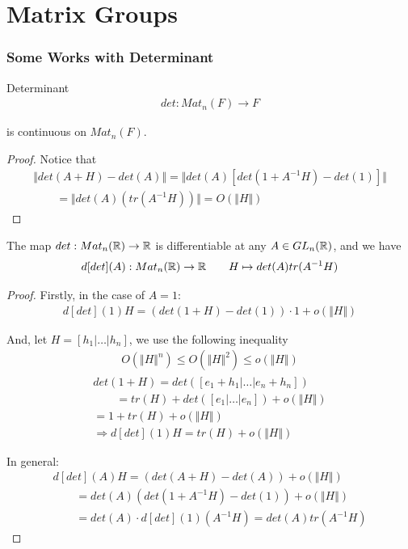 \documentclass[Total.tex]{subfiles}
\begin{document}
		\section{Matrix Groups}
			\subsubsection{Some Works with Determinant}
			
			\begin{lemma}
				Determinant
				\begin{gather*}
					det:Mat_n(F)\rightarrow F
				\end{gather*}
				
				is continuous on $Mat_n(F)$. 
			\end{lemma}
			\begin{proof}
				Notice that
				\begin{gather*}
					\Vert det(A+H)-det(A)\Vert =\Vert det(A)[det(1+A^{-1}H)-det(1)]\Vert \\
					\qquad =\Vert det(A)(tr(A^{-1}H))\Vert=O(\Vert H\Vert )
				\end{gather*}
			\end{proof}
			\begin{lemma}
				The map $det:Mat_n(\mathbb{R})\rightarrow \mathbb{R}$ is differentiable at any $A\in GL_n(\mathbb{R})$, and we have
				\begin{gather*}
					d[det](A):Mat_n(\mathbb{R})\rightarrow \mathbb{R}\qquad H\mapsto det(A)tr(A^{-1}H)
				\end{gather*}
			\end{lemma}
			\begin{proof}
				Firstly, in the case of $A=1$:
				\begin{gather*}
					d[det](1)H=(det(1+H)-det(1))\cdot 1+o(\Vert H\Vert)
				\end{gather*}
				
				And, let $H=[h_1|\dots|h_n]$, we use the following inequality
				\begin{gather*}
					O(\Vert H\Vert^n)\leq O(\Vert H\Vert^2)\leq o(\Vert H\Vert )
				\end{gather*}
				\begin{gather*}
					det(1+H)=det([e_1+h_1|\dots|e_n+h_n])\\\qquad=tr(H)+det([e_1|\dots|e_n])+o(\Vert H\Vert)\\
					=1+tr(H)+o(\Vert H\Vert)\\
					\Rightarrow d[det](1)H=tr(H)+o(\Vert H\Vert)
				\end{gather*}
				
				In general:
				\begin{gather*}
					d[det](A)H=(det(A+H)-det(A))+o(\Vert H\Vert)\\
					\qquad=det(A)(det(1+A^{-1}H)-det(1))+o(\Vert H\Vert)\\
					\qquad =det(A)\cdot d[det](1)(A^{-1}H)=det(A)tr(A^{-1}H)
				\end{gather*}
			\end{proof}
			
\end{document}
